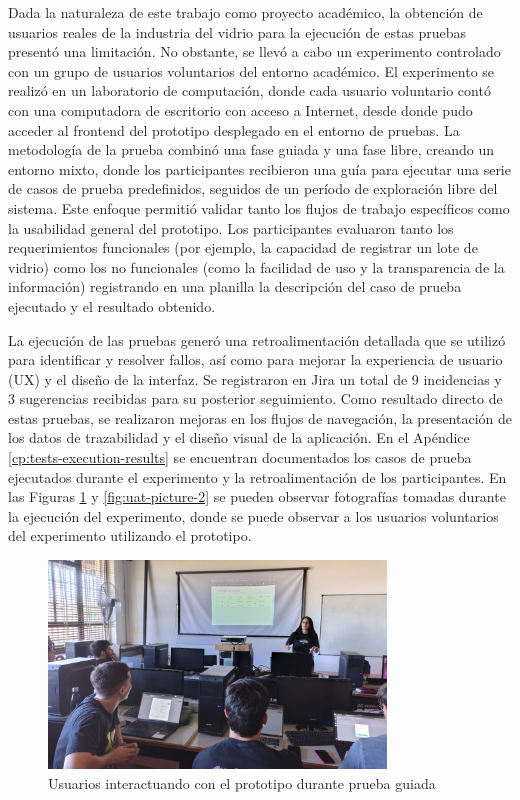 Dada la naturaleza de este trabajo como proyecto académico, la obtención de usuarios reales de la industria del vidrio para la ejecución de estas pruebas presentó una limitación. No obstante, se llevó a cabo un experimento controlado con un grupo de usuarios voluntarios del entorno académico. El experimento se realizó en un laboratorio de computación, donde cada usuario voluntario contó con una computadora de escritorio con acceso a Internet, desde donde pudo acceder al frontend del prototipo desplegado en el entorno de pruebas. La metodología de la prueba combinó una fase guiada y una fase libre, creando un entorno mixto, donde los participantes recibieron una guía para ejecutar una serie de casos de prueba predefinidos, seguidos de un período de exploración libre del sistema. Este enfoque permitió validar tanto los flujos de trabajo específicos como la usabilidad general del prototipo. Los participantes evaluaron tanto los requerimientos funcionales (por ejemplo, la capacidad de registrar un lote de vidrio) como los no funcionales (como la facilidad de uso y la transparencia de la información) registrando en una planilla la descripción del caso de prueba ejecutado y el resultado obtenido.

La ejecución de las pruebas generó una retroalimentación detallada que se utilizó para identificar y resolver fallos, así como para mejorar la experiencia de usuario (UX) y el diseño de la interfaz. Se registraron en Jira un total de 9 incidencias y 3 sugerencias recibidas para su posterior seguimiento. Como resultado directo de estas pruebas, se realizaron mejoras en los flujos de navegación, la presentación de los datos de trazabilidad y el diseño visual de la aplicación. En el Apéndice \ref{cp:tests-execution-results} se encuentran documentados los casos de prueba ejecutados durante el experimento y la retroalimentación de los participantes. En las Figuras \ref{fig:uat-picture-1} y \ref{fig:uat-picture-2} se pueden observar fotografías tomadas durante la ejecución del experimento, donde se puede observar a los usuarios voluntarios del experimento utilizando el prototipo.

\begin{figure}[!htb]
\centering
\includegraphics[width=0.8\textwidth]{Figures/uat-1.jpg}
\caption{Usuarios interactuando con el prototipo durante prueba guiada}
\label{fig:uat-picture-1}
\end{figure}

